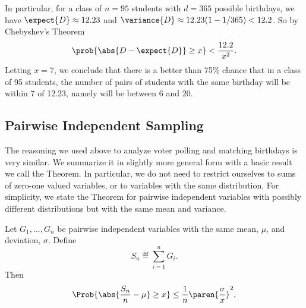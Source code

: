 In particular, for a class of $n= 95$ students with $d=365$ possible
birthdays, we have $\expect{D} \approx 12.23$ and $\variance{D} \approx 12.23 (1-
1/365) < 12.2$.  So by Chebyshev's Theorem
\[
\prob{\abs{D - \expect{D}} \geq x} < \frac{12.2}{x^2}.
\]
Letting $x=7$, we conclude that there is a better than 75\% chance
that in a class of 95 students, the number of pairs of students with
the same birthday will be within 7 of 12.23, namely will be between 6
and 20.


\subsection{Pairwise Independent Sampling}

The reasoning we used above to analyze voter polling and matching
birthdays is very similar.  We summarize it in slightly more general form
with a basic result we call the 
Theorem.  In particular, we do not need to restrict ourselves to sums of
zero-one valued variables, or to variables with the same distribution.
For simplicity, we state the Theorem for pairwise independent variables
with possibly different distributions but with the same mean and variance.

\begin{theorem}\label{th:pairwise-sampling}
Let $G_1, \dots, G_n$ be pairwise independent variables with the same
mean, $\mu$, and deviation, $\sigma$.  Define
\begin{equation}\label{ln14.Sn}
S_n \eqdef \sum_{i=1}^n G_i.
\end{equation}
Then
\[
\Prob{\abs{\frac{S_n}{n} - \mu} \geq x}
    \leq \frac{1}{n} \paren{\frac{\sigma}{x}}^2.
\]
\end{theorem}

